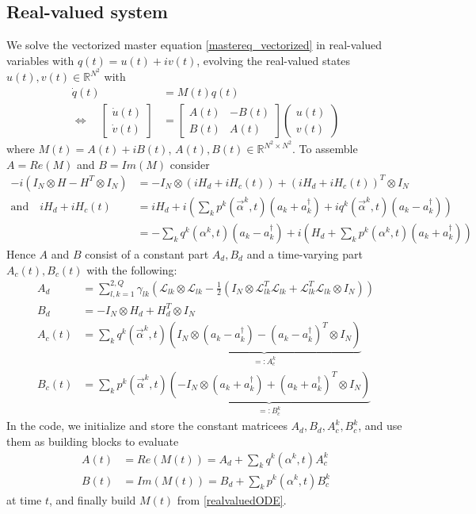 \documentclass[letterpaper]{article}
\newcommand{\Ell}{\mathcal{L}}
\newcommand{\R}{\mathds{R}}
\begin{document}
  \subsection{Real-valued system}
   We solve the vectorized master equation \eqref{mastereq_vectorized} in real-valued variables with $q(t) = u(t) + iv(t)$, evolving the real-valued states $u(t), v(t)\in \R^{N^2}$ with
   \begin{align}
     \dot q(t) &= M(t) q(t) \\
   \Leftrightarrow \quad \begin{bmatrix} \dot u(t) \\ \dot v(t) \end{bmatrix} &= 
   \begin{bmatrix} A(t) & -B(t) \\ B(t) & A(t) \end{bmatrix} \begin{pmatrix} u(t) \\ v(t) \end{pmatrix} \label{realvaluedODE}
   \end{align}
   where $M(t) = A(t) + i B(t)$, $A(t), B(t)\in \R^{N^2\times N^2}$. To assemble $A = Re(M)$ and $B = Im(M)$ consider
   \begin{align}
     -i(I_N \otimes H - H^T \otimes I_N) &= -I_N \otimes \left(iH_d + iH_c(t)\right) + \left(iH_d + iH_c(t)\right)^T \otimes I_N \\
     \text{and} \quad iH_d + iH_c(t) &= i H_d + i\left( \sum_k p^k(\vec{\alpha}^k,t)(a_k + a_k^{\dagger}) + iq^k(\vec{\alpha}^k,t)(a_k - a_k^{\dagger})\right) \\
                    &= - \sum_k q^k(\alpha^k,t)(a_k - a_k^{\dagger}) + i\left( H_d + \sum_k p^k(\alpha^k,t)(a_k+a_k^{\dagger}) \right) 
   \end{align}
   Hence $A$ and $B$ consist of a constant part $A_d, B_d$ and a time-varying part $A_c(t), B_c(t)$ with the following:
   \begin{align}
     A_d &=  \sum_{l,k=1}^{2,Q}\gamma_{lk} \left( \Ell_{lk}\otimes\Ell_{lk} - \frac 1 2 \left(I_N \otimes \Ell_{lk}^T\Ell_{lk} + \Ell_{lk}^T\Ell_{lk}\otimes I_N\right) \right)\\
     B_d &= -I_N \otimes H_d + H_d^T \otimes I_N \\
     A_c(t) &= \sum_k q^k(\vec{\alpha}^k,t) \underbrace{\left( I_N \otimes \left(a_k - a_k^{\dagger}\right) - \left(a_k - a_k^{\dagger}\right)^T\otimes I_N \right)}_{=:A_c^k} \\
     B_c(t) &= \sum_k p^k(\vec{\alpha}^k,t) \underbrace{\left( - I_N \otimes \left(a_k + a_k^{\dagger}\right) + \left(a_k + a_k^{\dagger}\right)^T\otimes I_N \right)}_{=:B_c^k} 
   \end{align}
   In the code, we initialize and store the constant matricees $A_d,B_d,A_c^k,  B_c^k$, and use them as building blocks to evaluate 
   \begin{align}
     A(t) &= Re(M(t)) = A_d + \sum_kq^k(\alpha^k, t)A_c^k \\
     B(t) &= Im(M(t)) = B_d + \sum_k p^k(\alpha^k, t)B_c^k
   \end{align}
   at time $t$, and finally build $M(t)$ from \eqref{realvaluedODE}.
\end{document}
